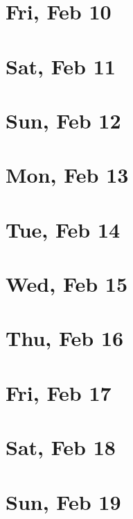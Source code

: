 	\section{Fri, Feb 10}
		
	\section{Sat, Feb 11}
		
	\section{Sun, Feb 12}
		
	\section{Mon, Feb 13}
		
	\section{Tue, Feb 14}
		
	\section{Wed, Feb 15}
		
	\section{Thu, Feb 16}
		
	\section{Fri, Feb 17}
		
	\section{Sat, Feb 18}
		
	\section{Sun, Feb 19}
		
